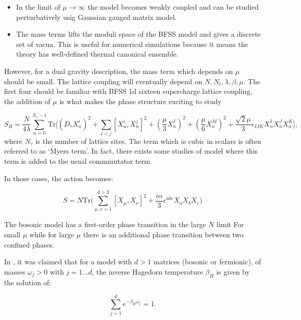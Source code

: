 \documentclass[11pt]{article}
\begin{document}
\begin{itemize}
	\item In the limit of $\mu\to\infty$ the model becomes weakly coupled and can be studied perturbatively usig Gaussian gauged matrix model.  
	\item The mass terms lifts the moduli space of the BFSS model and gives a discrete set of vacua. This is useful for numerical simulations because it means the theory has well-defined thermal canonical ensemble. 
\end{itemize}
However, for a dual gravity description, the mass term which depends on $\mu$ should be small. The lattice coupling will eventually depend on $N, N_{t}, \lambda, \beta, \mu$. The first four should be familiar with BFSS 1d sixteen supercharge lattice coupling, the addition of $\mu$ is what makes the phase structure exciting to study 


\begin{equation}
	S_B = \frac{N}{4\lambda} \sum_{n = 0}^{N_{\tau} - 1} \mbox{Tr} \Bigg[\left(D_{\tau} X_n^i\right)^2 + \sum_{i < j} \left[X_n^i, X_n^j\right]^2 
	+ \left(\frac{\mu}{3} X_n^I\right)^2 + \left(\frac{\mu}{6} X_n^M\right)^2
	+ \frac{\sqrt{2} \mu}{3} \epsilon_{IJK} X_n^I X_n^J X_n^K\Bigg],
\end{equation}
where $N_{\tau}$ is the number of lattice sites. The term which is cubic in scalars is often referred to as `Myers term'. In fact, there exists some studies of model where this term is added to the usual commmutator term.

In those cases, the action becomes:

\begin{equation}
	S = N \mbox{Tr} \Bigg( \sum_{\mu, \nu = 1}^{d > 3} [X_\mu, X_\nu]^2  + \frac{i \alpha}{3} \epsilon^{abc} X_a X_b X_c \Bigg) 
\end{equation}

The bosonic model has a first-order phase transition in the large $N$ limit
For small $\mu$ while for large $\mu$ there is an additional phase transition 
between two confined phases. 


In \cite{Furuuchi:2003sy}, it was claimed that for a model with $d > 1$ 
matrices (bosonic or fermionic), of masses $\omega_{j} > 0$ with $j =
1 . . . d$, the inverse Hagedorn temperature $\beta_{H}$ is given by the solution of:

\begin{equation}
\sum_{j=1}^{d} e^{-\beta_{H} \omega_{j}} = 1. 
\end{equation}
\end{document}
